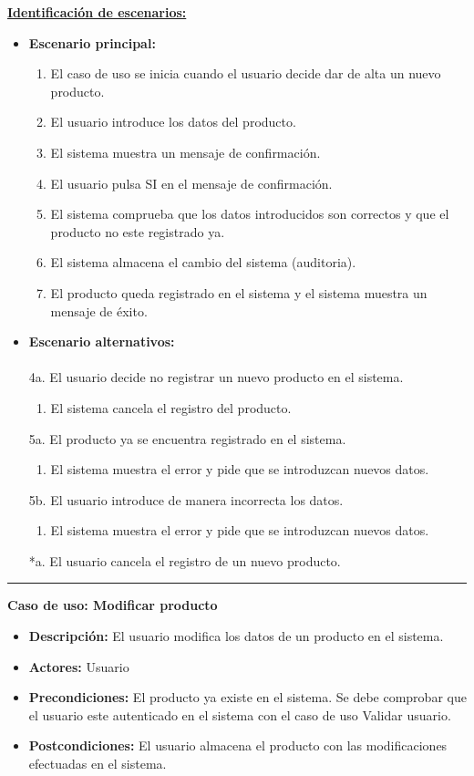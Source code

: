 \underline{\textbf{Identificación de escenarios:}}
\begin{itemize}\renewcommand{\labelitemi}{$\circ$}
 \item \textbf{Escenario principal:}
         \begin{enumerate}
          \item El caso de uso se inicia cuando el usuario decide dar de alta un nuevo producto.
          \item El usuario introduce los datos del producto.
	   \item El sistema muestra un mensaje de confirmación.
          \item El usuario pulsa SI en el mensaje de confirmación.
          \item El sistema comprueba que los datos introducidos son correctos y que el producto no este registrado ya.
 	  \item El sistema almacena el cambio del sistema (auditoria).
          \item El producto queda registrado en el sistema y el sistema muestra un mensaje de éxito.
         \end{enumerate}
  \item \textbf{Escenario alternativos:}\\\\
	4a. El usuario decide no registrar un nuevo producto en el sistema.
	      \begin{enumerate}
	       \item El sistema cancela el registro del producto.
	      \end{enumerate}
         5a. El producto ya se encuentra registrado en el sistema.
	      \begin{enumerate}
	       \item El sistema muestra el error y pide que se introduzcan nuevos datos.
	      \end{enumerate}
           5b. El usuario introduce de manera incorrecta los datos.
		\begin{enumerate}
		 \item El sistema muestra el error y pide que se introduzcan nuevos datos.
		\end{enumerate}
          *a. El usuario cancela el registro de un nuevo producto.
\end{itemize}
\smallskip
\hrule height 1pt
\smallskip
\textbf{Caso de uso: Modificar producto}
\begin{itemize}\renewcommand{\labelitemi}{$\cdot$}
 \item \textbf{Descripción:} El usuario modifica los datos de un producto en el sistema.
  \item \textbf{Actores:} Usuario
  \item \textbf{Precondiciones:} El producto ya existe en el sistema. Se debe comprobar que el usuario este autenticado en el sistema con el caso de uso Validar usuario.
  \item \textbf{Postcondiciones:} El usuario almacena el producto con las modificaciones efectuadas en el sistema.
\end{itemize}
